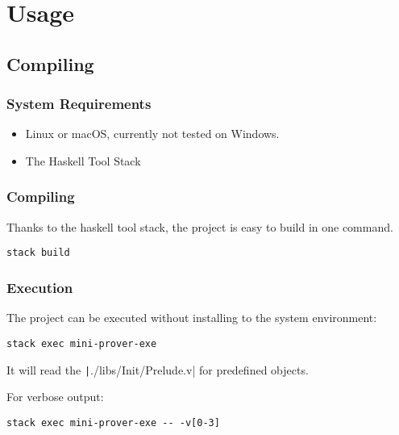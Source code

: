 \section{Usage}

\subsection{Compiling}

\subsubsection{System Requirements}
\begin{itemize}
    \item Linux or macOS, currently not tested on Windows.
    \item The Haskell Tool Stack
\end{itemize}

\subsubsection{Compiling}
Thanks to the haskell tool stack, the project is easy to build in one command.
\begin{center}
\begin{minipage}{0.7\textwidth}
\begin{verbatim}
stack build      
\end{verbatim}
\end{minipage}
\end{center}

\subsubsection{Execution}
The project can be executed without installing to the system environment:
\begin{center}
\begin{minipage}{0.7\textwidth}
\begin{verbatim}
stack exec mini-prover-exe
\end{verbatim}
\end{minipage}
\end{center}
It will read the \texttt|./libs/Init/Prelude.v| for predefined objects.

For verbose output:
\begin{center}
\begin{minipage}{0.7\textwidth}
\begin{verbatim}
stack exec mini-prover-exe -- -v[0-3]
\end{verbatim}
\end{minipage}
\end{center}

